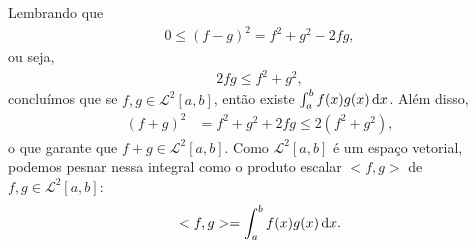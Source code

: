 \begin{obs}
    Lembrando que
    \begin{align*}
        0 \leq \left( f - g \right)^2 = f^2 + g^2 - 2 f g,
    \end{align*}
    ou seja,
    \begin{align*}
        2 f g \leq f^2 + g^2,
    \end{align*}
    conclu\'{i}mos que se $f, g \in \mathcal{L}^2[a, b]$, ent\~{a}o existe $\int_a^b f(x) g(x) \, \mathrm{d}x$. Al\'{e}m disso,
    \begin{align*}
        \left( f + g \right)^2 &= f^2 + g^2 + 2 f g \leq 2 \left( f^2 + g^2 \right),
    \end{align*}
    o que garante que $f + g \in \mathcal{L}^2[a, b]$. Como $\mathcal{L}^2[a, b]$ \'{e} um espa\c{c}o vetorial, podemos pesnar nessa integral como o produto escalar $<f, g>$ de $f, g \in \mathcal{L}^2[a, b]$:
    \begin{align*}
        <f, g> = \int_a^b f(x) g(x) \, \mathrm{d}x.
    \end{align*}
\end{obs}

